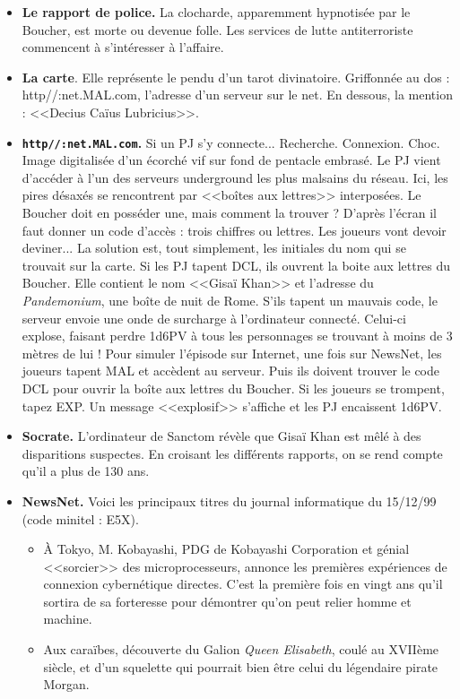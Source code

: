 \documentclass[11pt,twoside,a4paper]{book}
\begin{document}
\setlength\parindent{20pt}
\begin{itemize}
	\item \textbf{Le rapport de police. }La clocharde, apparemment hypnotis{\'e}e par le Boucher, est morte ou devenue folle. Les services de lutte antiterroriste commencent {\`a} s'int{\'e}resser {\`a} l'affaire.
	\item \textbf{La carte}. Elle repr{\'e}sente le pendu d'un tarot divinatoire. Griffonn{\'e}e au dos : http//:net.MAL.com, l'adresse d'un serveur sur le net. En dessous, la mention : <<Decius Ca{\"i}us Lubricius>>.
	\item \textbf{\texttt{http//:net.MAL.com}. }Si un PJ s'y connecte... Recherche. Connexion. Choc. Image digitalis{\'e}e d'un {\'e}corch{\'e} vif sur fond de pentacle embras{\'e}. Le PJ vient d'acc{\'e}der {\`a} l'un des serveurs underground les plus malsains du r{\'e}seau. Ici, les pires d{\'e}sax{\'e}s se rencontrent par <<bo{\^i}tes aux lettres>> interpos{\'e}es. Le Boucher doit en poss{\'e}der une, mais comment la trouver ? D'apr{\`e}s l'{\'e}cran il faut donner un code d'acc{\`e}s : trois chiffres ou lettres. Les joueurs vont devoir deviner... La solution est, tout simplement, les initiales du nom qui se trouvait sur la carte. Si les PJ tapent DCL, ils ouvrent la boite aux lettres du Boucher. Elle contient le nom <<Gisa{\"i} Khan>> et l'adresse du \textit{Pandemonium}, une bo{\^i}te de nuit de Rome. S'ils tapent un mauvais code, le serveur envoie une onde de surcharge {\`a} l'ordinateur connect{\'e}. Celui-ci explose, faisant perdre 1d6PV {\`a} tous les personnages se trouvant {\`a} moins de 3 m{\`e}tres de lui ! Pour simuler l'{\'e}pisode sur Internet, une fois sur NewsNet, les joueurs tapent MAL et acc{\`e}dent au serveur. Puis ils doivent trouver le code DCL pour ouvrir la bo{\^i}te aux lettres du Boucher. Si les joueurs se trompent, tapez EXP. Un message <<explosif>> s'affiche et les PJ encaissent 1d6PV.
	\item \textbf{Socrate. }L'ordinateur de Sanctom r{\'e}v{\`e}le que Gisa{\"i} Khan est m{\^e}l{\'e} {\`a} des disparitions suspectes. En croisant les diff{\'e}rents rapports, on se rend compte qu'il a plus de 130 ans.
	\item \textbf{NewsNet. }Voici les principaux titres du journal informatique du 15/12/99 (code minitel : E5X).
	\begin{itemize}
		\item[] {\`A} Tokyo, M. Kobayashi, PDG de Kobayashi Corporation et g{\'e}nial <<sorcier>> des microprocesseurs, annonce les premi{\`e}res exp{\'e}riences de connexion cybern{\'e}tique directes. C'est la premi{\`e}re fois en vingt ans qu'il sortira de sa forteresse pour d{\'e}montrer qu'on peut relier homme et machine.
		\item[] Aux cara{\"i}bes, d{\'e}couverte du Galion \emph{Queen Elisabeth}, coul{\'e} au XVII{\`e}me si{\`e}cle, et d'un squelette qui pourrait bien {\^e}tre celui du l{\'e}gendaire pirate Morgan.
	\end{itemize}
\end{itemize} %
\setlength\parindent{0pt}
\end{document}
